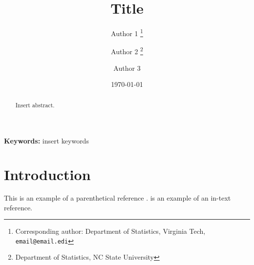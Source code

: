 \documentclass[11pt]{article}
\title{\vspace{-1cm} Title}
\author{Author 1 \thanks{Corresponding author: Department of Statistics, 
	Virginia Tech, {\tt email@email.edi}} 
	\and Author 2 \thanks{Department of Statistics, NC State University} 
	\and Author 3 \footnotemark[2]}
\date{\today}
\begin{document}
\maketitle

\begin{abstract} 
Insert abstract.
\end{abstract}

\noindent \textbf{Keywords:} insert keywords

\section{Introduction}\label{sec:intro}

This is an example of a parenthetical reference \citep{sauer2023active}.
\citet{sauer2023active} is an example of an in-text reference.



\end{document}
